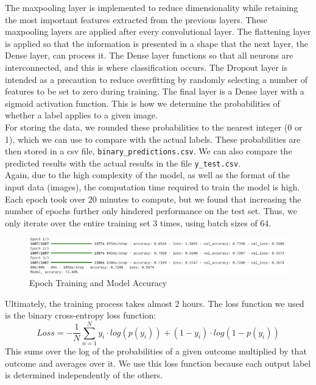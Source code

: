 \documentclass{article}
\begin{document}
The maxpooling layer is implemented to reduce dimensionality while retaining the most important features extracted from the previous layers. These maxpooling layers are applied after every convolutional layer. The flattening layer is applied so that the information is presented in a shape that the next layer, the Dense layer, can process it. The Dense layer functions so that all neurons are interconnected, and this is where classification occurs. The Dropout layer is intended as a precaution to reduce overfitting by randomly selecting a number of features to be set to zero during training. The final layer is a Dense layer with a sigmoid activation function. This is how we determine the probabilities of whether a label applies to a given image. \\
For storing the data, we rounded these probabilities to the nearest integer (0 or 1), which we can use to compare with the actual labels. These probabilities are then stored in a csv file, \verb|binary_predictions.csv|. We can also compare the predicted results with the actual results in the file \verb|y_test.csv|.\\

Again, due to the high complexity of the model, as well as the format of the input data (images), the computation time required to train the model is high. Each epoch took over 20 minutes to compute, but we found that increasing the number of epochs further only hindered performance on the test set. Thus, we only iterate over the entire training set 3 times, using batch sizes of 64. \\

\begin{figure}
    \centering
    \includegraphics[width=1\linewidth]{Screenshot 2024-05-25 231244.png}
    \caption{Epoch Training and Model Accuracy}
    \label{fig:enter-label}
\end{figure}
Ultimately, the training process takes almost 2 hours. The loss function we used is the binary cross-entropy loss function:
\[Loss = -\frac{1}{N} \sum_{n=1}^{N} y_i \cdot log(p(y_i))+(1-y_i) \cdot log(1-p(y_i))\]
This sums over the log of the probabilities of a given outcome multiplied by that outcome and averages over it. We use this loss function because each output label is determined independently of the others. \\
\end{document}
